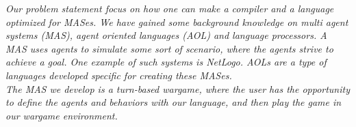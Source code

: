 \vspace{30pt}

\textit{Our problem statement focus on how one can make a compiler and a language optimized for MASes. We have gained some background knowledge on multi agent systems (MAS), agent oriented languages (AOL) and language processors. A MAS uses agents to simulate some sort of scenario, where the agents strive to achieve a goal. One example of such systems is NetLogo\cite{misc:netlogo}. AOLs are a type of languages developed specific for creating these MASes.\\ \indent
The MAS we develop is a turn-based wargame, where the user has the opportunity to define the agents and behaviors with our language, and then play the game in our wargame environment.}